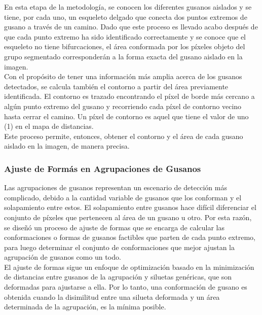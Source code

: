 En esta etapa de la metodolog\'ia, se conocen los diferentes gusanos aislados
y se tiene, por cada uno, un esqueleto delgado que conecta dos puntos
extremos de gusano a trav\'es de un camino.
Dado que este proceso es llevado acabo despu\'es de que cada punto extremo
ha sido identificado correctamente y se conoce que el esqueleto no tiene
bifurcaciones, el \'area conformada por los p\'ixeles objeto del grupo
segmentado corresponder\'an a la forma exacta del gusano aislado en la
imagen.\\

Con el prop\'osito de tener una informaci\'on m\'as amplia acerca de los gusanos
detectados, se calcula tambi\'en el contorno a partir del \'area previamente identificada.
El contorno es trazado encontrando el p\'ixel de borde m\'as cercano a alg\'un punto extremo
del gusano y recorriendo cada p\'ixel de contorno vecino hasta cerrar el camino. 
Un p\'ixel de contorno es aquel que tiene el valor de uno (1) en el mapa de distancias.\\

Este proceso permite, entonces, obtener el contorno y el \'area de cada
gusano aislado en la imagen, de manera precisa.

\subsubsection{Ajuste de Form\'as en Agrupaciones de Gusanos}
\label{sec:clusterfit}

Las agrupaciones de gusanos representan un escenario de detecci\'on m\'as complicado, 
debido a la cantidad variable de gusanos que los conforman y el solapamiento entre estos.
El solapamiento entre gusanos hace dif\'icil diferenciar el conjunto de p\'ixeles que pertenecen
al \'area de un gusano u otro. Por esta raz\'on, se dise\~n\'o un proceso de ajuste de formas
que se encarga de calcular las conformaciones o formas de gusanos factibles que parten
de cada punto extremo, para luego determinar el conjunto de conformaciones que mejor
ajustan la agrupaci\'on de gusanos como un todo.\\

El ajuste de formas sigue un enfoque de optimizaci\'on basado en la minimizaci\'on
de distancias entre gusanos de la agrupaci\'on y siluetas gen\'ericas, que son deformadas
para ajustarse a ella. Por lo tanto, una conformaci\'on de gusano es obtenida cuando
la disimilitud entre una silueta deformada y un \'area determinada de la agrupaci\'on, 
es la m\'inima posible.\\

